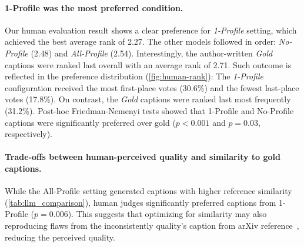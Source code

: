 \paragraph{1-Profile was the most preferred condition.} Our human evaluation result shows a clear preference for \textit{1-Profile} setting, which achieved the best average rank of 2.27. The other models followed in order: \textit{No-Profile} (2.48) and \textit{All-Profile} (2.54). Interestingly, the author-written \textit{Gold} captions were ranked last overall with an average rank of 2.71. Such outcome is reflected in the preference distribution (\autoref{fig:human-rank}): The \textit{1-Profile} configuration received the most first-place votes (30.6\%) and the fewest last-place votes (17.8\%). On contrast, the \textit{Gold} captions were ranked last most frequently (31.2\%).
Post-hoc Friedman-Nemenyi tests showed that 1-Profile and No-Profile captions were significantly preferred over gold ($p < 0.001$ and $p = 0.03$, respectively).

\paragraph{Trade-offs between human-perceived quality and similarity to gold captions.} 
While the All-Profile setting generated captions with higher reference similarity (\autoref{tab:llm_comparison}), human judges significantly preferred captions from 1-Profile ($p = 0.006$). 
This suggests that optimizing for similarity may also reproducing flaws from the inconsistently quality's caption from arXiv reference~\cite{huang-etal-2023-summaries}, reducing the perceived quality.

